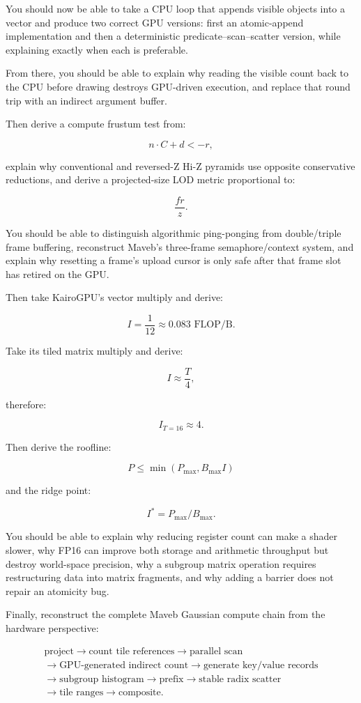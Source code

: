 You should now be able to take a CPU loop that appends visible objects into a vector and produce two correct GPU versions: first an atomic-append implementation and then a deterministic predicate--scan--scatter version, while explaining exactly when each is preferable.

From there, you should be able to explain why reading the visible count back to the CPU before drawing destroys GPU-driven execution, and replace that round trip with an indirect argument buffer.

Then derive a compute frustum test from:

\[
n\cdot C+d<-r,
\]

explain why conventional and reversed-Z Hi-Z pyramids use opposite conservative reductions, and derive a projected-size LOD metric proportional to:

\[
\frac{fr}{z}.
\]

You should be able to distinguish algorithmic ping-ponging from double/triple frame buffering, reconstruct Maveb's three-frame semaphore/context system, and explain why resetting a frame's upload cursor is only safe after that frame slot has retired on the GPU.

Then take KairoGPU's vector multiply and derive:

\[
I=
\frac1{12}
\approx0.083
\text{ FLOP/B}.
\]

Take its tiled matrix multiply and derive:

\[
I\approx\frac T4,
\]

therefore:

\[
I_{T=16}\approx4.
\]

Then derive the roofline:

\[
\boxed{
P
\le
\min(
P_{\max},
B_{\max}I
)
}
\]

and the ridge point:

\[
\boxed{
I^*=
P_{\max}/B_{\max}.
}
\]

You should be able to explain why reducing register count can make a shader slower, why FP16 can improve both storage and arithmetic throughput but destroy world-space precision, why a subgroup matrix operation requires restructuring data into matrix fragments, and why adding a barrier does not repair an atomicity bug.

Finally, reconstruct the complete Maveb Gaussian compute chain from the hardware perspective:

\[\begin{gathered}\text{project}\rightarrow\text{count tile references}\rightarrow\text{parallel scan}\\\rightarrow\text{GPU-generated indirect count}\rightarrow\text{generate key/value records}\\\rightarrow\text{subgroup histogram}\rightarrow\text{prefix}\rightarrow\text{stable radix scatter}\\\rightarrow\text{tile ranges}\rightarrow\text{composite}.\end{gathered}\]

